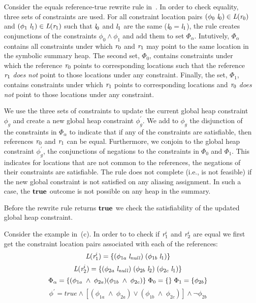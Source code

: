 Consider the equals reference-true rewrite rule
in~. In order to check equality, three
sets of constraints are used. For all constraint location pairs $(\phi_0\ \emph{l}_0)
\in \emph{L}(\emph{r}_0)$ and $(\phi_1\ \emph{l}_1) \in \emph{L}(\emph{r}_1)$ such that $\emph{l}_0$ and $\emph{l}_1$
are the same ($\emph{l}_0 = \emph{l}_1$), the rule creates conjunctions of the constraints
$\phi_0 \wedge \phi_1$ and add them to set $\Phi_\alpha$. Intutively,
$\Phi_\alpha$ contains all constraints under which $\emph{r}_0$ and $\emph{r}_1$ may
point to the same location in the symbolic summary heap. The second
set, $\Phi_0$, contains constraints under which the reference $\emph{r}_0$
points to corresponding locations such that the reference $\emph{r}_1$
\emph{does not} point to those locations under any
constraint. Finally, the set, $\Phi_1$, contains constraints under
which $\emph{r}_1$ points to corresponding locations and $\emph{r}_0$ \emph{does
  not} point to those locations under any constraint.

We use the three sets of constraints to update the current global heap
constraint $\phi_g$ and create a new global heap constraint
$\phi_g^\prime$. We add to $\phi_g$ the disjunction of the constraints
in $\Phi_\alpha$ to indicate that if any of the constraints are
satisfiable, then references $\emph{r}_0$ and $\emph{r}_1$ can be
equal. Furthermore, we conjoin to the global heap constraint 
$\phi_g^\prime$, the conjunctions of negations to the constraints in
$\Phi_0$ and $\Phi_1$. This indicates for locations that are not
common to the references, the negations of their constraints are
satisfiable. The rule does not complete (i.e., is not feasible) if the new
 global constraint is not satisfied on any aliasing assignment. In such a case, 
 the $\textbf{true}$ outcome is not possible on any heap in the summary.

Before the rewrite rule returns $\textbf{true}$ we check the
satisfiability of the updated global heap constraint.

Consider the example in~(c). In order to to check
if $\emph{r}_1^i$ and $\emph{r}_2^i$ are equal we first get the constraint location
pairs associated with each of the references:
\[
\emph{L}(\emph{r}_1^i) = \{ (\phi_{1a}\; \emph{l}_\mathit{null})\; (\phi_{1b}\; \emph{l}_1) \} 
\]
\[
\emph{L}(\emph{r}_2^i) = \{ (\phi_{2a}\; \emph{l}_\mathit{null})\; (\phi_{2b}\; \emph{l}_2)\; (\phi_{2c}\; \emph{l}_1) \} \\
\]
\[
\Phi_\alpha = \{ (\phi_{1a}\; \wedge\; \phi_{2a} ) (\phi_{1b}\; \wedge\; \phi_{2c} ) \}\;
\Phi_0 = \{ \}\; \Phi_1 = \{ \phi_{2b}\} \\
\]
\[
\phi^\prime = \mathit{true} \wedge [ (\phi_{1a}\; \wedge\; \phi_{2a} )\vee (\phi_{1b}\; \wedge\; \phi_{2c} ) ] \wedge \neg\phi_{2b} 
\]
